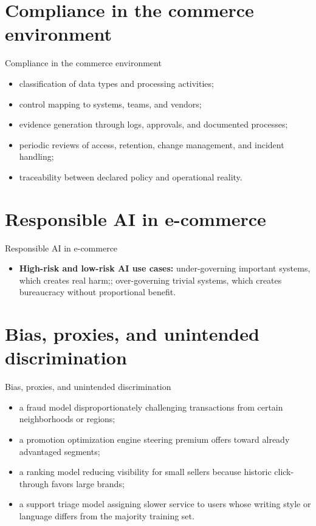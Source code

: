 \documentclass[aspectratio=169]{beamer}
\begin{document}
\section{Compliance in the commerce environment}

\begin{frame}{Compliance in the commerce environment}
  \begin{itemize}
    \item classification of data types and processing activities;
    \item control mapping to systems, teams, and vendors;
    \item evidence generation through logs, approvals, and documented processes;
    \item periodic reviews of access, retention, change management, and incident handling;
    \item traceability between declared policy and operational reality.
  \end{itemize}
\end{frame}

\section{Responsible AI in e-commerce}

\begin{frame}{Responsible AI in e-commerce}
  \begin{itemize}
    \item \textbf{High-risk and low-risk AI use cases:} under-governing important systems, which creates real harm;; over-governing trivial systems, which creates bureaucracy without proportional benefit.
  \end{itemize}
\end{frame}

\section{Bias, proxies, and unintended discrimination}

\begin{frame}{Bias, proxies, and unintended discrimination}
  \begin{itemize}
    \item a fraud model disproportionately challenging transactions from certain neighborhoods or regions;
    \item a promotion optimization engine steering premium offers toward already advantaged segments;
    \item a ranking model reducing visibility for small sellers because historic click-through favors large brands;
    \item a support triage model assigning slower service to users whose writing style or language differs from the majority training set.
  \end{itemize}
\end{frame}
\end{document}
